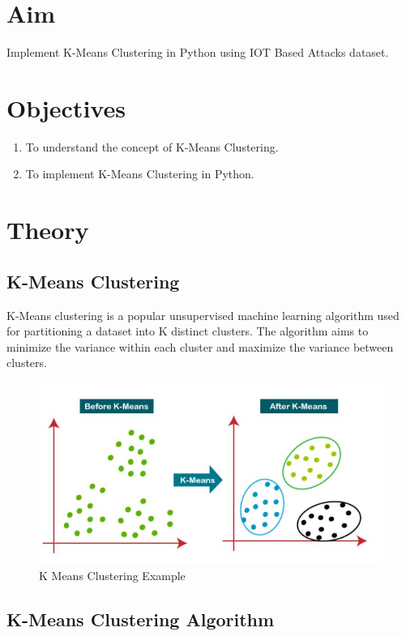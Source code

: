 \documentclass[11pt]{article}
\begin{document}
\tableofcontents
\thispagestyle{empty}
\clearpage

\setcounter{page}{1}

\section{Aim}
Implement K-Means Clustering in Python using IOT Based Attacks dataset.

\section{Objectives}
\begin{enumerate}
    \item To understand the concept of K-Means Clustering.
    \item To implement K-Means Clustering in Python.
\end{enumerate}

\section{Theory}
\subsection{K-Means Clustering}

K-Means clustering is a popular unsupervised machine learning algorithm used for partitioning a dataset into K distinct clusters. The algorithm aims to minimize the variance within each cluster and maximize the variance between clusters.

\begin{figure}[H]
    \centering
    \includegraphics[width=.85\textwidth]{kmeans.jpg}
    \caption{K Means Clustering Example}
\end{figure}
\subsection{K-Means Clustering Algorithm}
\end{document}
